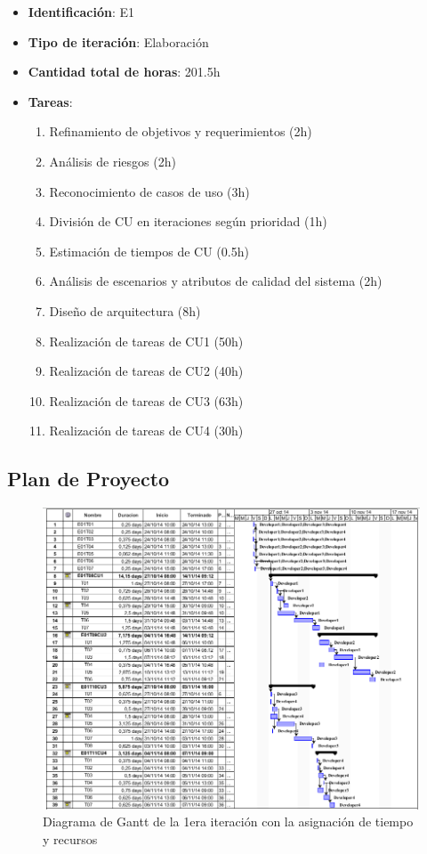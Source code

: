 \begin{itemize}
\item \textbf{Identificación}: E1
\item \textbf{Tipo de iteración}: Elaboración
\item \textbf{Cantidad total de horas}: 201.5h
\item \textbf{Tareas}:
	\begin{enumerate}
	\item Refinamiento de objetivos y requerimientos (2h)
	\item Análisis de riesgos (2h)
	\item Reconocimiento de casos de uso (3h)
	\item División de CU en iteraciones según prioridad (1h)
	\item Estimación de tiempos de CU (0.5h)
	\item Análisis de escenarios y atributos de calidad del sistema (2h)
	\item Diseño de arquitectura (8h)
	\item Realización de tareas de CU1 (50h)
	\item Realización de tareas de CU2 (40h)
	\item Realización de tareas de CU3 (63h)
	\item Realización de tareas de CU4 (30h)
	\end{enumerate}
\end{itemize}

\clearpage

\subsection{Plan de Proyecto}

\begin{figure}[h!]
  \centering
  \includegraphics[width=1\textwidth]{plan.png}
  \caption{Diagrama de Gantt de la 1era iteración con la asignación de tiempo y recursos}
  \label{fig:clases4}
\end{figure}
